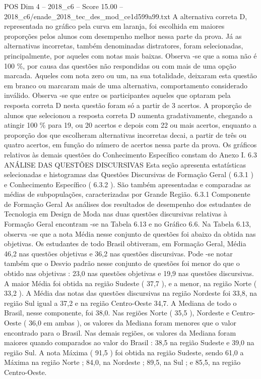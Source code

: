 \begin{textsample}{POS Dim 4 – 2018\_c6 – Score 15.00 – 2018\_c6/enade\_2018\_tec\_des\_mod\_ce1d599a99.txt}
A alternativa correta D, representada no gráfico pela curva em laranja, foi escolhida em maiores proporções pelos alunos com desempenho melhor nessa parte da prova.
Já as alternativas incorretas, também denominadas distratores, foram selecionadas, principalmente, por aqueles com notas mais baixas.
Observa -se que a soma não é 100 \%, por causa das questões não respondidas ou com mais de uma opção marcada.
Aqueles com nota zero ou um, na sua totalidade, deixaram esta questão em branco ou marcaram mais de uma alternativa, comportamento considerado inválido.
Observa -se que entre os participantes aqueles que optaram pela resposta correta D nesta questão foram só a partir de 3 acertos.
A proporção de alunos que selecionou a resposta correta D aumenta gradativamente, chegando a atingir 100 \% para 19, ou 20 acertos e depois com 22 ou mais acertos, enquanto a proporção dos que escolheram alternativas incorretas decai, a partir de três ou quatro acertos, em função do número de acertos nessa parte da prova.
Os gráficos relativos às demais questões do Conhecimento Específico constam do Anexo I. 6.3 ANÁLISE DAS QUESTÕES DISCURSIVAS Esta seção apresenta estatísticas selecionadas e histogramas das Questões Discursivas de Formação Geral ( 6.3.1 ) e Conhecimento Específico ( 6.3.2 ).
São também apresentadas e comparadas as médias de subpopulações, caracterizadas por Grande Região. 6.3.1 Componente de Formação Geral As análises dos resultados de desempenho dos estudantes de Tecnologia em Design de Moda nas duas questões discursivas relativas à Formação Geral encontram -se na Tabela 6.13 e no Gráfico 6.6.
Na Tabela 6.13, observa -se que a nota Média nesse conjunto de questões foi abaixo da obtida nas objetivas.
Os estudantes de todo Brasil obtiveram, em Formação Geral, Média 46,2 nas questões objetivas e 36,2 nas questões discursivas.
Pode -se notar também que o Desvio padrão nesse conjunto de questões foi menor do que o obtido nas objetivas : 23,0 nas questões objetivas e 19,9 nas questões discursivas.
A maior Média foi obtida na região Sudeste ( 37,7 ), e a menor, na região Norte ( 33,2 ).
A Média das notas das questões discursivas na região Nordeste foi 33,8, na região Sul igual a 37,2 e na região Centro-Oeste 34,7.
A Mediana de todo o Brasil, nesse componente, foi 38,0.
Nas regiões Norte ( 35,5 ), Nordeste e Centro-Oeste ( 36,0 em ambas ), os valores da Mediana foram menores que o valor encontrado para o Brasil.
Nas demais regiões, os valores da Mediana foram maiores quando comparados ao valor do Brasil : 38,5 na região Sudeste e 39,0 na região Sul.
A nota Máxima ( 91,5 ) foi obtida na região Sudeste, sendo 61,0 a Máxima na região Norte ; 84,0, na Nordeste ; 89,5, na Sul ; e 85,5, na região Centro-Oeste.

\end{textsample}
